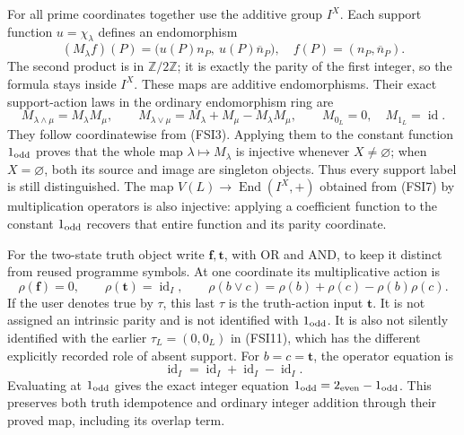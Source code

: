 For all prime coordinates together use the additive group \(I^X\).
Each support function \(u=\chi_\lambda\) defines an endomorphism
\begin{equation}\tag{FSI18}
(M_\lambda f)(P)
=\bigl(u(P)n_P,\ u(P)\overline n_P\bigr),
\quad f(P)=(n_P,\overline n_P).
\end{equation}
The second product is in \(\mathbb Z/2\mathbb Z\);
it is exactly the parity of the first integer, so the formula
stays inside \(I^X\). These maps are additive endomorphisms.
Their exact support-action laws in the ordinary endomorphism ring are
\begin{equation}\tag{FSI19}
M_{\lambda\wedge\mu}=M_\lambda M_\mu,\qquad
M_{\lambda\vee\mu}=M_\lambda+M_\mu-M_\lambda M_\mu,\qquad
M_{0_L}=0,\quad M_{1_L}=\operatorname{id}.
\end{equation}
They follow coordinatewise from (FSI3).
Applying them to the constant function \(1_{\rm odd}\) proves that
the whole map \(\lambda\mapsto M_\lambda\) is injective whenever
\(X\ne\varnothing\); when \(X=\varnothing\), both its source and
image are singleton objects. Thus every support label is still
distinguished. The map \(V(L)\to\operatorname{End}(I^X,+)\) obtained
from (FSI7) by multiplication operators is also injective: applying
a coefficient function to the constant \(1_{\rm odd}\) recovers
that entire function and its parity coordinate.

For the two-state truth object write \(\mathbf f,\mathbf t\),
with OR and AND, to keep it distinct from reused programme symbols.
At one coordinate its multiplicative action is
\begin{equation}\tag{FSI20}
\rho(\mathbf f)=0,\qquad \rho(\mathbf t)=\operatorname{id}_I,\qquad
\rho(b\vee c)=\rho(b)+\rho(c)-\rho(b)\rho(c).
\end{equation}
If the user denotes true by \(\tau\), this last \(\tau\) is the
truth-action input \(\mathbf t\). It is not assigned an intrinsic
parity and is not identified with \(1_{\rm odd}\).
It is also not silently identified with the earlier
\(\tau_L=(0,0_L)\) in (FSI11), which has the different explicitly
recorded role of absent support.
For \(b=c=\mathbf t\), the operator equation is
\[
\operatorname{id}_I
=\operatorname{id}_I+\operatorname{id}_I-\operatorname{id}_I.
\]
Evaluating at \(1_{\rm odd}\) gives the exact integer equation
\(1_{\rm odd}=2_{\rm even}-1_{\rm odd}\).
This preserves both truth idempotence and ordinary integer addition
through their proved map, including its overlap term.

